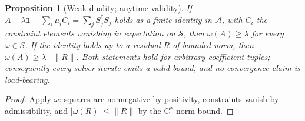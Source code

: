 \documentclass[11pt]{article}
\newtheorem{proposition}[theorem]{Proposition}
\theoremstyle{definition}
\theoremstyle{remark}
\newcommand{\A}{\mathcal{A}}
\begin{document}
\begin{proposition}[Weak duality; anytime validity]\label{prop:weak}
If $A - \lambda\mathbf 1 - \sum_i \mu_i C_i = \sum_j S_j^\dagger S_j$
holds as a finite identity in $\A$, with $C_i$ the constraint elements
vanishing in expectation on $\mathcal S$, then $\omega(A) \ge \lambda$
for every $\omega \in \mathcal S$.  If the identity holds up to a
residual $R$ of bounded norm, then $\omega(A) \ge \lambda - \|R\|$.
Both statements hold for arbitrary coefficient tuples; consequently every
solver iterate emits a valid bound, and no convergence claim is
load-bearing.
\end{proposition}
\begin{proof}
Apply $\omega$: squares are nonnegative by positivity, constraints vanish
by admissibility, and $|\omega(R)| \le \|R\|$ by the C$^*$ norm bound.
\end{proof}
\end{document}
